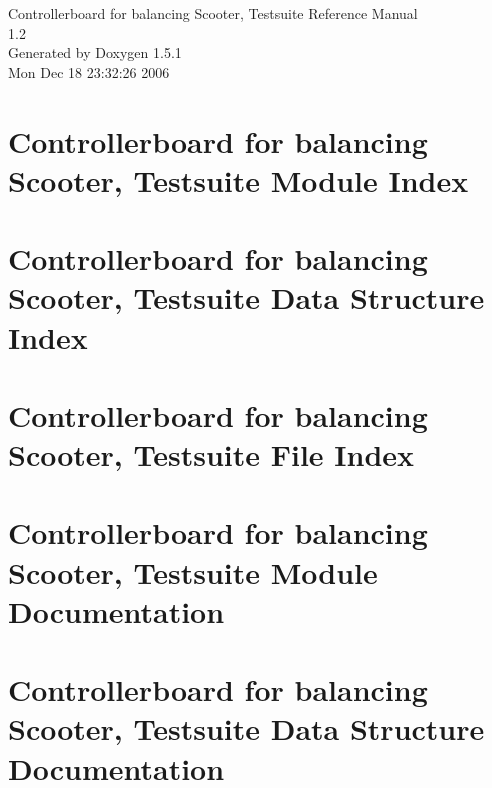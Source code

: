 \documentclass[a4paper]{book}
\begin{document}
\begin{titlepage}
\vspace*{7cm}
\begin{center}
{\Large Controllerboard for balancing Scooter, Testsuite Reference Manual\\[1ex]\large 1.2 }\\
\vspace*{1cm}
{\large Generated by Doxygen 1.5.1}\\
\vspace*{0.5cm}
{\small Mon Dec 18 23:32:26 2006}\\
\end{center}
\end{titlepage}
\clearemptydoublepage
{}
\tableofcontents
\clearemptydoublepage
{}
\chapter{Controllerboard for balancing Scooter, Testsuite Module Index}

\chapter{Controllerboard for balancing Scooter, Testsuite Data Structure Index}

\chapter{Controllerboard for balancing Scooter, Testsuite File Index}

\chapter{Controllerboard for balancing Scooter, Testsuite Module Documentation}














\chapter{Controllerboard for balancing Scooter, Testsuite Data Structure Documentation}


\end{document}
